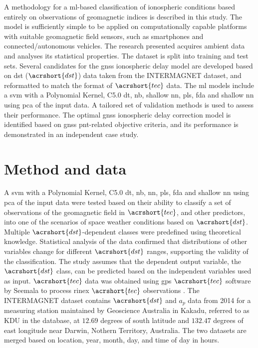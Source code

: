 \let\LaTeXcline\cline\documentclass[sn-mathphys-num]{sn-jnl}\let\cline\LaTeXcline
\begin{document}
A methodology for a \acrlong{ml}-based classification of ionospheric conditions based entirely on observations of geomagnetic indices is described in this study. The model is sufficiently simple to be applied on computationally capable platforms with suitable geomagnetic field sensors, such as smartphones and connected/autonomous vehicles. The research presented acquires ambient data and analyses its statistical properties. The dataset is split into training and test sets. Several candidates for the \acrshort{gnss} ionospheric delay model are developed based on \acrlong{dst} ($\acrshort{dst}$) data taken from the INTERMAGNET \cite{Intermagnet2022-cj} dataset, and reformatted to match the format of $\acrshort{tec}$ data. The \acrfull{ml} models include a \acrfull{svm} with a Polynomial Kernel, C5.0 \acrfull{dt}, \acrfull{nb}, shallow \acrfull{nn}, \acrfull{pls}, \acrfull{fda} and shallow \acrfull{nn} using \acrfull{pca} of the input data. A tailored set of validation methods is used to assess their performance. The optimal \acrshort{gnss} ionospheric delay correction model is identified based on \acrshort{gnss} \acrshort{pnt}-related objective criteria, and its performance is demonstrated in an independent case study.

\section{Method and data}
\label{sec:Dataset}

A \acrfull{svm} with a Polynomial Kernel, C5.0 \acrfull{dt}, \acrfull{nb}, \acrfull{nn}, \acrfull{pls}, \acrfull{fda} and shallow \acrfull{nn} using \acrfull{pca} of the input data were tested based on their ability to classify a set of observations of the geomagnetic field in $\acrshort{tec}$, and other predictors, into one of the scenarios of space weather conditions based on $\acrshort{dst}$. Multiple $\acrshort{dst}$-dependent classes were predefined using theoretical knowledge. Statistical analysis of the data confirmed that distributions of other variables change for different $\acrshort{dst}$ ranges, supporting the validity of the classification. The study assumes that the dependent output variable, the $\acrshort{dst}$ class, can be predicted based on the independent variables used as input. $\acrshort{tec}$ data was obtained using \acrshort{gps} $\acrshort{tec}$ software by Seemala to process \acrshort{rinex} $\acrshort{tec}$ observations \cite{SEEMALA202363}. The INTERMAGNET \cite{Intermagnet2022-cj} dataset contains $\acrshort{dst}$ and $a_{p}$ data from 2014 for a measuring station maintained by Geoscience Australia in Kakadu, referred to as KDU in the database, at $12.69$ degrees of south latitude and $132.47$ degrees of east longitude near Darwin, Nothern Territory, Australia. The two datasets are merged based on location, year, month, day, and time of day in hours.
\end{document}
